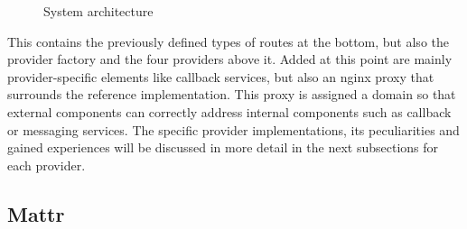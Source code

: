     \begin{figure}[ht]
	    \centering    	    
	    \makebox[\textwidth]{}       
	    \caption{System architecture}
        \label{figure: sys architecture}
    \end{figure}
    
    This contains the previously defined types of routes at the bottom, but also the provider factory and the four providers above it. Added at this point are mainly provider-specific elements like callback services, but also an nginx proxy that surrounds the reference implementation. This proxy is assigned a domain so that external components can correctly address internal components such as callback or messaging services. The specific provider implementations, its peculiarities and gained experiences will be discussed in more detail in the next subsections for each provider.
    
        \subsection{Mattr}
        
